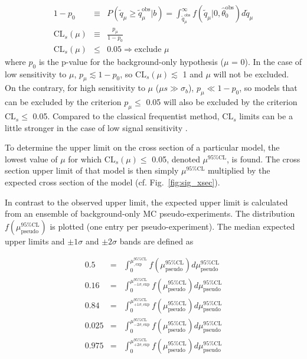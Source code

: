 \documentclass[dissertation.tex]{subfiles}
\begin{document}
\begin{eqnarray}
\label{eq:CLb_p_value}
1 - p_{0} &\equiv& P(\tilde{q}_{\mu} \geq \tilde{q}_{\mu}^{\mathrm{obs}} | b) = \int_{\tilde{q}_{\mu}^{\mathrm{obs}}}^{\infty} f(\tilde{q}_{\mu} | 0, \hat{\theta}_{0}^{\mathrm{obs}}) d\tilde{q}_{\mu} \\
\mbox{CL}_{s}(\mu) &\equiv& \frac{p_{\mu}}{1 - p_{0}} \\
\mbox{CL}_{s}(\mu) &\leq& 0.05 \Rightarrow \mbox{exclude }\mu \nonumber
\end{eqnarray}
%
where $p_{0}$ is the p-value for the background-only hypothesis ($\mu$ = 0).  In the case of low sensitivity to $\mu$, $p_{\mu} \lesssim 1 - p_{0}$, so $\mbox{CL}_{s}(\mu) \lesssim$ 1 and $\mu$ will not be excluded.  On the contrary, for high sensitivity to $\mu$ ($\mu s \gg \sigma_{b}$), $p_{\mu} \ll 1 - p_{0}$, so models that can be excluded by the criterion $p_{\mu} \leq$ 0.05 will also be excluded by the criterion $\mbox{CL}_{s} \leq$ 0.05.  Compared to the classical frequentist method, $\mbox{CL}_{s}$ limits can be a little stronger in the case of low signal sensitivity \cite{CMS-NOTE-2011/005}.

To determine the upper limit on the cross section of a particular model, the lowest value of $\mu$ for which $\mbox{CL}_{s}(\mu) \leq$ 0.05, denoted $\mu^{95\%\mathrm{CL}}$, is found.  The cross section upper limit of that model is then simply $\mu^{95\%\mathrm{CL}}$ multiplied by the expected cross section of the model (cf. Fig.~\ref{fig:sig_xsec}).

In contrast to the observed upper limit, the expected upper limit is calculated from an ensemble of background-only MC pseudo-experiments.  The distribution $f(\mu^{95\%\mathrm{CL}}_{\mathrm{pseudo}})$ is plotted (one entry per pseudo-experiment).  The median expected upper limits and $\pm1\sigma$ and $\pm2\sigma$ bands are defined as 

\begin{eqnarray}
\label{eq:exp_limits}
0.5 &=& \int_{0}^{\mu^{95\%\mathrm{CL}}_{\mathrm{,exp}}} f(\mu^{95\%\mathrm{CL}}_{\mathrm{pseudo}})d\mu^{95\%\mathrm{CL}}_{\mathrm{pseudo}} \\
0.16 &=& \int_{0}^{\mu^{95\%\mathrm{CL}}_{-1\sigma\mathrm{,exp}}} f(\mu^{95\%\mathrm{CL}}_{\mathrm{pseudo}})d\mu^{95\%\mathrm{CL}}_{\mathrm{pseudo}} \\
0.84 &=& \int_{0}^{\mu^{95\%\mathrm{CL}}_{+1\sigma\mathrm{,exp}}} f(\mu^{95\%\mathrm{CL}}_{\mathrm{pseudo}})d\mu^{95\%\mathrm{CL}}_{\mathrm{pseudo}} \\
0.025 &=& \int_{0}^{\mu^{95\%\mathrm{CL}}_{-2\sigma\mathrm{,exp}}} f(\mu^{95\%\mathrm{CL}}_{\mathrm{pseudo}})d\mu^{95\%\mathrm{CL}}_{\mathrm{pseudo}} \\
0.975 &=& \int_{0}^{\mu^{95\%\mathrm{CL}}_{+2\sigma\mathrm{,exp}}} f(\mu^{95\%\mathrm{CL}}_{\mathrm{pseudo}})d\mu^{95\%\mathrm{CL}}_{\mathrm{pseudo}}
\end{eqnarray}
\end{document}
